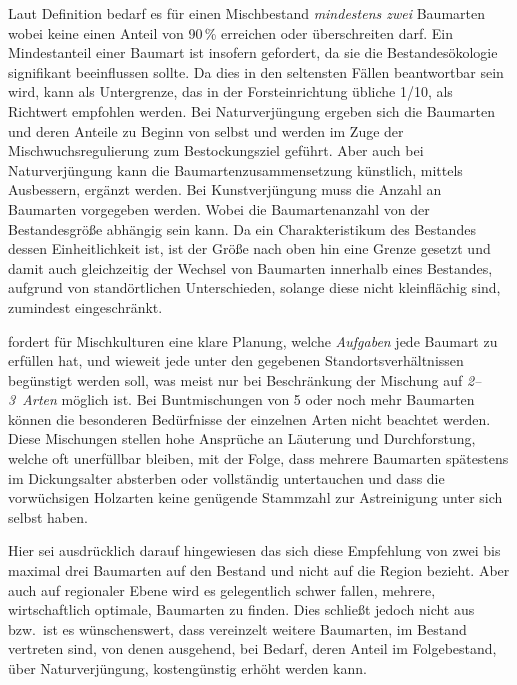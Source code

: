 \documentclass[twocolumn]{scrartcl}
\begin{document}
Laut Definition bedarf es für einen Mischbestand \emph{mindestens
  zwei} Baumarten wobei keine einen Anteil von 90\,\% erreichen oder
überschreiten darf. Ein Mindestanteil einer Baumart ist insofern
gefordert, da sie die Bestandesökologie signifikant beeinflussen
sollte. Da dies in den seltensten Fällen beantwortbar sein wird, kann
als Untergrenze, das in der Forsteinrichtung übliche 1/10, als
Richtwert empfohlen werden. Bei Naturverjüngung ergeben sich die
Baumarten und deren Anteile zu Beginn von selbst und werden im Zuge
der Mischwuchsregulierung zum Bestockungsziel geführt. Aber auch bei
Naturverjüngung kann die Baumartenzusammensetzung künstlich, mittels
Ausbessern, ergänzt werden. Bei Kunstverjüngung muss die Anzahl an
Baumarten vorgegeben werden. Wobei die Baumartenanzahl von der
Bestandesgröße abhängig sein kann. Da ein Charakteristikum des
Bestandes dessen Einheitlichkeit ist, ist der Größe nach oben hin
eine Grenze gesetzt und damit auch gleichzeitig der Wechsel von
Baumarten innerhalb eines Bestandes, aufgrund von standörtlichen
Unterschieden, solange diese nicht kleinflächig sind, zumindest
eingeschränkt.

\citet[S.~218\,f.]{wiedemann1951Ertragskunde} fordert für
Mischkulturen \frqq eine klare Planung, welche \emph{Aufgaben} jede
Baumart zu erfüllen hat, und wieweit jede unter den gegebenen
Standortsverhältnissen begünstigt werden soll, was meist nur bei
Beschränkung der Mischung auf \emph{2--3~Arten} möglich ist. Bei
Buntmischungen von 5 oder noch mehr Baumarten können die besonderen
Bedürfnisse der einzelnen Arten nicht beachtet werden. Diese
Mischungen stellen hohe Ansprüche an Läuterung und Durchforstung,
welche oft unerfüllbar bleiben, mit der Folge, dass mehrere Baumarten
spätestens im Dickungsalter absterben oder vollständig untertauchen
und dass die vorwüchsigen Holzarten keine genügende Stammzahl zur
Astreinigung unter sich selbst haben.\flqq{}

Hier sei ausdrücklich darauf hingewiesen das sich diese Empfehlung von
zwei bis maximal drei Baumarten auf den Bestand und nicht auf die
Region bezieht. Aber auch auf regionaler Ebene wird es gelegentlich
schwer fallen, mehrere, wirtschaftlich optimale, Baumarten zu finden.
Dies schließt jedoch nicht aus bzw.\ ist es wünschenswert, dass
vereinzelt weitere Baumarten, im Bestand vertreten sind, von denen
ausgehend, bei Bedarf, deren Anteil im Folgebestand, über
Naturverjüngung, kostengünstig erhöht werden kann.
\end{document}
